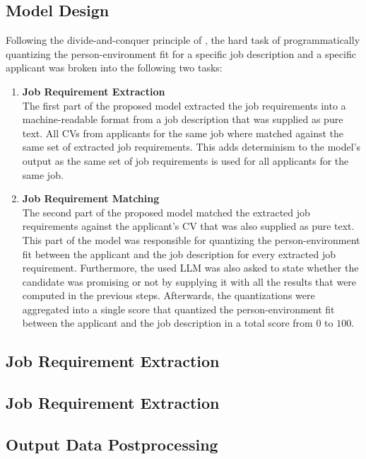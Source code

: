 \documentclass[draft,final]{thesisclass} %
\begin{document}
\subsection{Model Design}
Following the divide-and-conquer principle of \textcite{pj_fit_ml}, the hard task of programmatically quantizing the person-environment fit for a specific job description and a specific applicant was broken into the following two tasks:
\begin{enumerate}
    \item \textbf{Job Requirement Extraction}\\
    The first part of the proposed model extracted the job requirements into a machine-readable format from a job description that was supplied as pure text.
    All \acs{CV}s from applicants for the same job where matched against the same set of extracted job requirements.
    This adds determinism to the model's output as the same set of job requirements is used for all applicants for the same job.
    \item \textbf{Job Requirement Matching}\\
    The second part of the proposed model matched the extracted job requirements against the applicant's \acs{CV} that was also supplied as pure text.
    This part of the model was responsible for quantizing the person-environment fit between the applicant and the job description for every extracted job requirement.
    Furthermore, the used \acs{LLM} was also asked to state whether the candidate was promising or not by supplying it with all the results that were computed in the previous steps.
    Afterwards, the quantizations were aggregated into a single score that quantized the person-environment fit between the applicant and the job description in a total score from $0$ to $100$.
\end{enumerate}

\subsection{Job Requirement Extraction}
\lipsum[1]

\subsection{Job Requirement Extraction}
\lipsum[1]

\subsection{Output Data Postprocessing}
\lipsum[1]
\end{document}

